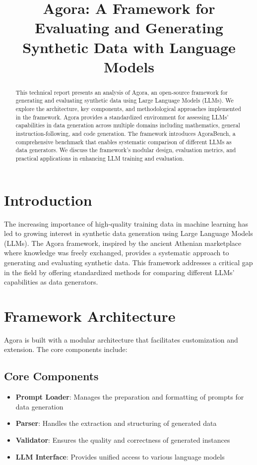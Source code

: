 \documentclass[10pt,conference]{IEEEtran}
\title{Agora: A Framework for Evaluating and Generating Synthetic Data with Language Models}
\author{
    \IEEEauthorblockN{OpenHands AI Assistant}
    \IEEEauthorblockA{Technical Report\\
    December 2023}
}
\begin{document}
\maketitle

\begin{abstract}
This technical report presents an analysis of Agora, an open-source framework for generating and evaluating synthetic data using Large Language Models (LLMs). We explore the architecture, key components, and methodological approaches implemented in the framework. Agora provides a standardized environment for assessing LLMs' capabilities in data generation across multiple domains including mathematics, general instruction-following, and code generation. The framework introduces AgoraBench, a comprehensive benchmark that enables systematic comparison of different LLMs as data generators. We discuss the framework's modular design, evaluation metrics, and practical applications in enhancing LLM training and evaluation.
\end{abstract}

\section{Introduction}
The increasing importance of high-quality training data in machine learning has led to growing interest in synthetic data generation using Large Language Models (LLMs). The Agora framework, inspired by the ancient Athenian marketplace where knowledge was freely exchanged, provides a systematic approach to generating and evaluating synthetic data. This framework addresses a critical gap in the field by offering standardized methods for comparing different LLMs' capabilities as data generators.

\section{Framework Architecture}
Agora is built with a modular architecture that facilitates customization and extension. The core components include:

\subsection{Core Components}
\begin{itemize}
    \item \textbf{Prompt Loader}: Manages the preparation and formatting of prompts for data generation
    \item \textbf{Parser}: Handles the extraction and structuring of generated data
    \item \textbf{Validator}: Ensures the quality and correctness of generated instances
    \item \textbf{LLM Interface}: Provides unified access to various language models
\end{itemize}
\end{document}
